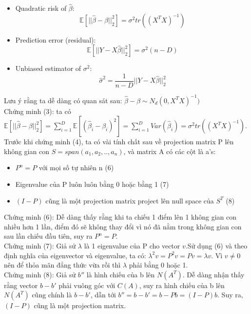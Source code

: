 \documentclass[10pt]{article}
\begin{document}
\begin{enumerate}
\begin{itemize}
\item Quadratic risk of $\hat{\beta}$:
\[  \mathbb{E}[|| \hat{\beta} - \beta||^2_2]= \sigma^2 tr((X^{T}X)^{-1}) \tag{3} \]
\item  Prediction error (residual):
\[ \mathbb{E}[||Y-X\hat{\beta}||^2_2] = \sigma^2 (n-D) \tag{4}\]
\item  Unbiased estimator of $\sigma^2$:
\[ \hat{\sigma}^2 = \frac{1}{n-D}||Y-X\hat{\beta}||^2_2 \tag{5}\]

\end{itemize}
Lưu ý rằng ta dễ dàng có quan sát sau: $\hat{\beta} -\beta \sim N_d(0, X^{T}X)^{-1})$\\
Chứng minh (3): ta có $\mathbb{E}[ ||\hat{\beta} - \beta||^2_2]=\sum_{i=1}^{D}\mathbb{E}[(\hat{\beta}_i -\beta_i)^2]=\sum_{i=1}^{D}Var(\hat{\beta}_i)=\sigma^2 tr((X^{T}X)^{-1})$.\\
Trước khi chứng minh (4), ta có vài tính chất sau về projection matrix P lên không gian con $S = span(a_1, a_2,..,a_n)$, và matrix A có các cột là a's:
\begin{itemize}

\item $P^{n}=P$ với mọi số tự nhiên n (6)
\item Eigenvalue của P luôn luôn bằng 0 hoặc bằng 1 (7)
\item  $(I - P)$ cũng là một projection matrix project lên null space của $S^{T}$ (8)

\end{itemize}
Chứng minh (6): Dễ dàng thấy rằng khi ta chiếu 1 điểm lên 1 không gian con nhiều hơn 1 lần, điểm đó sẽ không thay đổi vì nó đã nằm trong không gian con sau lần chiếu đầu tiên, suy ra $P^{n}=P$.\\

Chứng minh (7): Giả sử $\lambda$ là 1 eigenvalue của P cho vector $v$.Sử dụng (6) và theo định nghĩa của eigenvector và eigenvalue, ta có: $\lambda^2v=P^2v= Pv=\lambda v$. Vì $v \neq 0$ nên để thỏa mãn đẳng thức vừa rồi thì $\lambda$ phải bằng 0 hoặc 1.\\

Chứng minh (8): Giả sử $b''$ là hình chiếu của b lên $N(A^{T})$. Dễ dàng nhận thấy rằng vector $b-b'$ phải vuông góc với $C(A)$, suy ra hình chiếu của b lên $N(A^{T})$ cũng chính là $b-b'$, dẫn tới $b''=b-b'=b-Pb=(I-P)b$. Suy ra, $(I-P)$ cũng là một projection matrix.\\


\end{enumerate}
\end{document}

